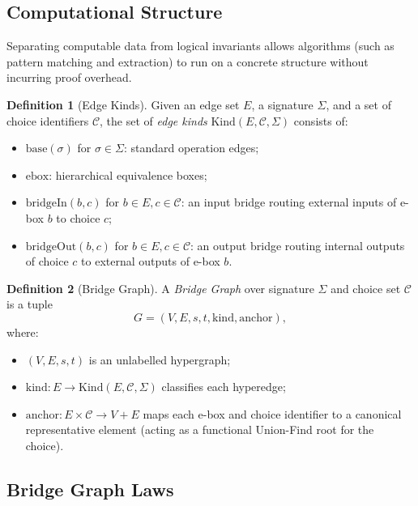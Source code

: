 \documentclass[11pt,a4paper]{article}
\theoremstyle{definition}
\newtheorem{definition}{Definition}[section]
\theoremstyle{plain}
\begin{document}
\subsection{Computational Structure}

Separating computable data from logical invariants allows algorithms (such as pattern matching and extraction) to run on a concrete structure without incurring proof overhead.

\begin{definition}[Edge Kinds]
Given an edge set $E$, a signature $\Sigma$, and a set of choice identifiers $\mathcal{C}$, the set of \emph{edge kinds} $\mathrm{Kind}(E, \mathcal{C}, \Sigma)$ consists of:
\begin{itemize}
    \item $\mathrm{base}(\sigma)$ for $\sigma \in \Sigma$: standard operation edges;
    \item $\mathrm{ebox}$: hierarchical equivalence boxes;
    \item $\mathrm{bridgeIn}(b, c)$ for $b \in E, c \in \mathcal{C}$: an input bridge routing external inputs of e-box $b$ to choice $c$;
    \item $\mathrm{bridgeOut}(b, c)$ for $b \in E, c \in \mathcal{C}$: an output bridge routing internal outputs of choice $c$ to external outputs of e-box $b$.
\end{itemize}
\end{definition}

\begin{definition}[Bridge Graph]
A \emph{Bridge Graph} over signature $\Sigma$ and choice set $\mathcal{C}$ is a tuple
\[
G = (V, E, s, t, \mathrm{kind}, \mathrm{anchor}),
\]
where:
\begin{itemize}
    \item $(V, E, s, t)$ is an unlabelled hypergraph;
    \item $\mathrm{kind} \colon E \to \mathrm{Kind}(E, \mathcal{C}, \Sigma)$ classifies each hyperedge;
    \item $\mathrm{anchor} \colon E \times \mathcal{C} \to V + E$ maps each e-box and choice identifier to a canonical representative element (acting as a functional Union-Find root for the choice).
\end{itemize}
\end{definition}

\subsection{Bridge Graph Laws}
\end{document}
